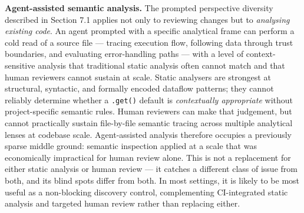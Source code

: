 \documentclass[a4paper,11pt]{report}
\begin{document}
\textbf{Agent-assisted semantic analysis.} The prompted perspective
diversity described in Section 7.1 applies not only to reviewing changes
but to \emph{analysing existing code}. An agent prompted with a specific
analytical frame can perform a cold read of a source file --- tracing
execution flow, following data through trust boundaries, and evaluating
error-handling paths --- with a level of context-sensitive analysis that
traditional static analysis often cannot match and that human reviewers
cannot sustain at scale. Static analysers are strongest at structural,
syntactic, and formally encoded dataflow patterns; they cannot reliably
determine whether a \texttt{.get()} default is \emph{contextually
appropriate} without project-specific semantic rules. Human reviewers
can make that judgement, but cannot practically sustain file-by-file
semantic tracing across multiple analytical lenses at codebase scale.
Agent-assisted analysis therefore occupies a previously sparse middle
ground: semantic inspection applied at a scale that was economically
impractical for human review alone. This is not a replacement for either
static analysis or human review --- it catches a different class of
issue from both, and its blind spots differ from both. In most settings,
it is likely to be most useful as a non-blocking discovery control,
complementing CI-integrated static analysis and targeted human review
rather than replacing either.
\end{document}
